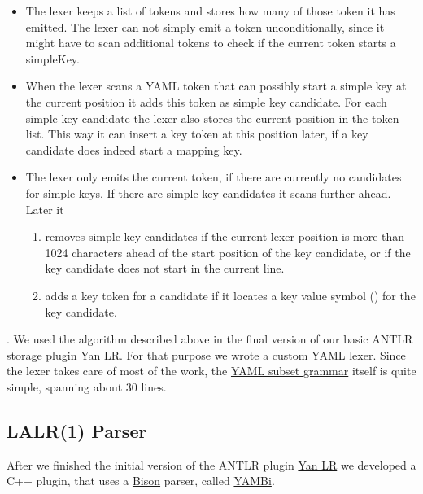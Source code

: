 \begin{itemize}

  \item The lexer keeps a list of tokens and stores how many of those token it has emitted. The lexer can not simply emit a token unconditionally, since it might have to scan additional tokens to check if the current token starts a \gls{simpleKey}.

  \item When the lexer scans a YAML token that can possibly start a simple key at the current position it adds this token as simple key candidate. For each simple key candidate the lexer also stores the current position in the token list. This way it can insert a key token at this position later, if a key candidate does indeed start a mapping key.

  \item The lexer only emits the current token, if there are currently no candidates for simple keys. If there are simple key candidates it scans further ahead. Later it

  \begin{enumerate}
    \item removes simple key candidates if the current lexer position is more than 1024 characters ahead of the start position of the key candidate, or if the key candidate does not start in the current line.

    \item adds a key token for a candidate if it locates a key value symbol (\yaml{:}) for the key candidate.
  \end{enumerate}

\end{itemize}

. We used the algorithm described above in the final version of our basic ANTLR storage plugin \href{https://www.libelektra.org/plugins/yanlr}{Yan LR}. For that purpose we wrote a custom YAML lexer. Since the lexer takes care of most of the work, the \href{https://github.com/ElektraInitiative/libelektra/blob/48ccea7107584b1aa28f19ab2b65c9b30090f124/src/plugins/yanlr/YAML.g4}{YAML subset grammar} itself is quite simple, spanning about 30 lines.

\subsection{LALR(1) Parser}

After we finished the initial version of the ANTLR plugin \href{https://www.libelektra.org/plugins/yanlr}{Yan LR} we developed a C++ plugin, that uses a \href{https://www.gnu.org/software/bison}{Bison} parser, called \href{https://www.libelektra.org/plugins/yambi}{YAMBi}.

